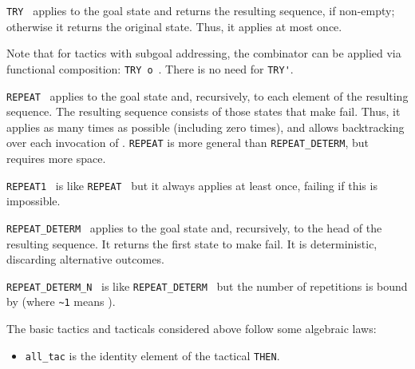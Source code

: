 \begin{isabellebody}
\begin{isamarkuptext}
  \begin{description}

  \item \verb|TRY|~ applies  to the goal
  state and returns the resulting sequence, if non-empty; otherwise it
  returns the original state.  Thus, it applies  at most
  once.

  Note that for tactics with subgoal addressing, the combinator can be
  applied via functional composition: \verb|TRY|~\verb|o|~.  There is no need for \verb|TRY'|.

  \item \verb|REPEAT|~ applies  to the goal
  state and, recursively, to each element of the resulting sequence.
  The resulting sequence consists of those states that make  fail.  Thus, it applies  as many times as
  possible (including zero times), and allows backtracking over each
  invocation of .  \verb|REPEAT| is more general than \verb|REPEAT_DETERM|, but requires more space.

  \item \verb|REPEAT1|~ is like \verb|REPEAT|~
  but it always applies  at least once, failing if this
  is impossible.

  \item \verb|REPEAT_DETERM|~ applies  to the
  goal state and, recursively, to the head of the resulting sequence.
  It returns the first state to make  fail.  It is
  deterministic, discarding alternative outcomes.

  \item \verb|REPEAT_DETERM_N|~ is like \verb|REPEAT_DETERM|~ but the number of repetitions is bound
  by  (where \verb|~1| means ).

  \end{description}%
\end{isamarkuptext}%
\isamarkuptrue%
%
\endisatagmlref
{\isafoldmlref}%
%
\isadelimmlref
%
\endisadelimmlref
%
\isadelimmlex
%
\endisadelimmlex
%
\isatagmlex
%
\begin{isamarkuptext}%
The basic tactics and tacticals considered above follow
  some algebraic laws:

  \begin{itemize}

  \item \verb|all_tac| is the identity element of the tactical \verb|THEN|.


\end{itemize}
\end{isamarkuptext}
\end{isabellebody}
